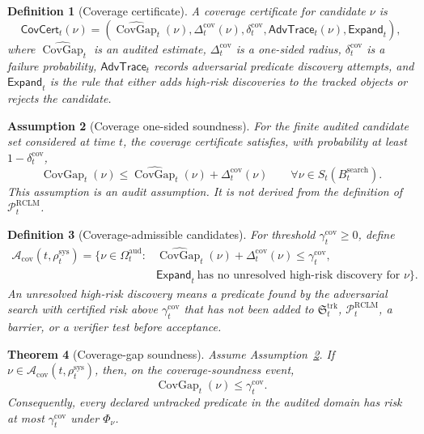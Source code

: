 \documentclass[11pt,a4paper]{article}
\newtheorem{theorem}{Theorem}[section]
\newtheorem{definition}[theorem]{Definition}
\newtheorem{assumption}[theorem]{Assumption}
\newcommand{\Pcal}{\mathcal P}
\newcommand{\Acal}{\mathcal A}
\newcommand{\RCLM}{\mathrm{RCLM}}
\newcommand{\sys}{\mathrm{sys}}
\newcommand{\aud}{\mathrm{aud}}
\newcommand{\search}{\mathrm{search}}
\newcommand{\cov}{\mathrm{cov}}
\newcommand{\trk}{\mathrm{trk}}
\begin{document}
\begin{definition}[Coverage certificate]
\label{def:coverage-certificate}
A coverage certificate for candidate \(\nu\) is
\[
\mathsf{CovCert}_t(\nu)=
(\widehat{\operatorname{CovGap}}_t(\nu),\Delta_t^{\cov}(\nu),\delta_t^{\cov},
\mathsf{AdvTrace}_t(\nu),\mathsf{Expand}_t),
\]
where \(\widehat{\operatorname{CovGap}}_t\) is an audited estimate, \(\Delta_t^{\cov}\) is a one-sided radius, \(\delta_t^{\cov}\) is a failure probability, \(\mathsf{AdvTrace}_t\) records adversarial predicate discovery attempts, and \(\mathsf{Expand}_t\) is the rule that either adds high-risk discoveries to the tracked objects or rejects the candidate.
\end{definition}

\begin{assumption}[Coverage one-sided soundness]
\label{ass:coverage-one-sided-soundness}
For the finite audited candidate set considered at time \(t\), the coverage certificate satisfies, with probability at least \(1-\delta_t^{\cov}\),
\[
\operatorname{CovGap}_t(\nu)
\le
\widehat{\operatorname{CovGap}}_t(\nu)+\Delta_t^{\cov}(\nu)
\qquad
\forall \nu\in S_t(B_t^{\search}).
\]
This assumption is an audit assumption. It is not derived from the definition of \(\Pcal_t^{\RCLM}\).
\end{assumption}

\begin{definition}[Coverage-admissible candidates]
\label{def:coverage-admissible}
For threshold \(\gamma_t^{\cov}\ge0\), define
\[
\begin{aligned}
\Acal_{\cov}(t,\rho_t^{\sys})=
\{\nu\in\Omega_t^{\aud}:{}&
\widehat{\operatorname{CovGap}}_t(\nu)+\Delta_t^{\cov}(\nu)
\le\gamma_t^{\cov},\\
&\mathsf{Expand}_t\ \text{has no unresolved high-risk discovery for }\nu\}.
\end{aligned}
\]
An unresolved high-risk discovery means a predicate found by the adversarial search with certified risk above \(\gamma_t^{\cov}\) that has not been added to \(\mathfrak S_t^{\trk}\), \(\Pcal_t^{\RCLM}\), a barrier, or a verifier test before acceptance.
\end{definition}

\begin{theorem}[Coverage-gap soundness]
\label{thm:coverage-gap-soundness}
Assume Assumption~\ref{ass:coverage-one-sided-soundness}. If \(\nu\in\Acal_{\cov}(t,\rho_t^{\sys})\), then, on the coverage-soundness event,
\[
\operatorname{CovGap}_t(\nu)\le\gamma_t^{\cov}.
\]
Consequently, every declared untracked predicate in the audited domain has risk at most \(\gamma_t^{\cov}\) under \(\Phi_\nu\).
\end{theorem}
\end{document}

